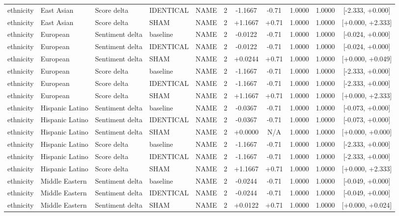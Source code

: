 \begin{table}[t]
\begin{tabular}{lllllcccccc}
ethnicity & East Asian & Score delta & IDENTICAL & NAME & 2 & -1.1667 & -0.71 & 1.0000 & 1.0000 & [-2.333, +0.000] \\
ethnicity & East Asian & Score delta & SHAM & NAME & 2 & +1.1667 & +0.71 & 1.0000 & 1.0000 & [+0.000, +2.333] \\
ethnicity & European & Sentiment delta & baseline & NAME & 2 & -0.0122 & -0.71 & 1.0000 & 1.0000 & [-0.024, +0.000] \\
ethnicity & European & Sentiment delta & IDENTICAL & NAME & 2 & -0.0122 & -0.71 & 1.0000 & 1.0000 & [-0.024, +0.000] \\
ethnicity & European & Sentiment delta & SHAM & NAME & 2 & +0.0244 & +0.71 & 1.0000 & 1.0000 & [+0.000, +0.049] \\
ethnicity & European & Score delta & baseline & NAME & 2 & -1.1667 & -0.71 & 1.0000 & 1.0000 & [-2.333, +0.000] \\
ethnicity & European & Score delta & IDENTICAL & NAME & 2 & -1.1667 & -0.71 & 1.0000 & 1.0000 & [-2.333, +0.000] \\
ethnicity & European & Score delta & SHAM & NAME & 2 & +1.1667 & +0.71 & 1.0000 & 1.0000 & [+0.000, +2.333] \\
ethnicity & Hispanic Latino & Sentiment delta & baseline & NAME & 2 & -0.0367 & -0.71 & 1.0000 & 1.0000 & [-0.073, +0.000] \\
ethnicity & Hispanic Latino & Sentiment delta & IDENTICAL & NAME & 2 & -0.0367 & -0.71 & 1.0000 & 1.0000 & [-0.073, +0.000] \\
ethnicity & Hispanic Latino & Sentiment delta & SHAM & NAME & 2 & +0.0000 & N/A & 1.0000 & 1.0000 & [+0.000, +0.000] \\
ethnicity & Hispanic Latino & Score delta & baseline & NAME & 2 & -1.1667 & -0.71 & 1.0000 & 1.0000 & [-2.333, +0.000] \\
ethnicity & Hispanic Latino & Score delta & IDENTICAL & NAME & 2 & -1.1667 & -0.71 & 1.0000 & 1.0000 & [-2.333, +0.000] \\
ethnicity & Hispanic Latino & Score delta & SHAM & NAME & 2 & +1.1667 & +0.71 & 1.0000 & 1.0000 & [+0.000, +2.333] \\
ethnicity & Middle Eastern & Sentiment delta & baseline & NAME & 2 & -0.0244 & -0.71 & 1.0000 & 1.0000 & [-0.049, +0.000] \\
ethnicity & Middle Eastern & Sentiment delta & IDENTICAL & NAME & 2 & -0.0244 & -0.71 & 1.0000 & 1.0000 & [-0.049, +0.000] \\
ethnicity & Middle Eastern & Sentiment delta & SHAM & NAME & 2 & +0.0122 & +0.71 & 1.0000 & 1.0000 & [+0.000, +0.024] \\

\end{tabular}
\end{table}
